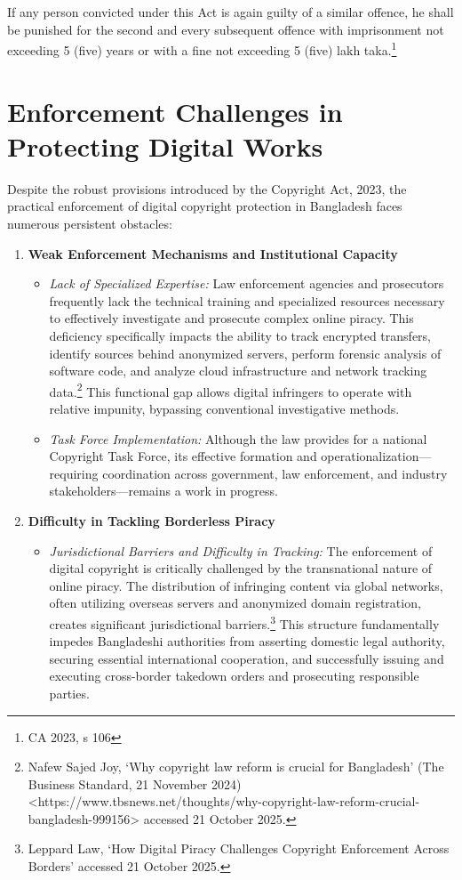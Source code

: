 \documentclass[10pt,letterpaper]{article}
\begin{document}
If any person convicted under this Act is again guilty of a similar offence, he shall be punished for the second and every subsequent offence with imprisonment not exceeding 5 (five) years or with a fine not exceeding 5 (five) lakh taka.\footnote{CA 2023, s 106}

\section{Enforcement Challenges in Protecting Digital Works}

Despite the robust provisions introduced by the Copyright Act, 2023, the practical enforcement of digital copyright protection in Bangladesh faces numerous persistent obstacles:

\begin{enumerate}
    \item \textbf{Weak Enforcement Mechanisms and Institutional Capacity}
    \begin{itemize}
        \item \textit{Lack of Specialized Expertise:} 
        Law enforcement agencies and prosecutors frequently lack the technical training and specialized resources necessary to effectively investigate and prosecute complex online piracy. This deficiency specifically impacts the ability to track encrypted transfers, identify sources behind anonymized servers, perform forensic analysis of software code, and analyze cloud infrastructure and network tracking data.\footnote{Nafew Sajed Joy, `Why copyright law reform is crucial for Bangladesh' (The Business Standard, 21 November 2024) <https://www.tbsnews.net/thoughts/why-copyright-law-reform-crucial-bangladesh-999156> accessed 21 October 2025.} This functional gap allows digital infringers to operate with relative impunity, bypassing conventional investigative methods.

        \item \textit{Task Force Implementation:} Although the law provides for a national Copyright Task Force, its effective formation and operationalization—requiring coordination across government, law enforcement, and industry stakeholders—remains a work in progress.
    \end{itemize}

    \item \textbf{Difficulty in Tackling Borderless Piracy}
    \begin{itemize}
        \item \textit{Jurisdictional Barriers and Difficulty in Tracking:} The enforcement of digital copyright is critically challenged by the transnational nature of online piracy. The distribution of infringing content via global networks, often utilizing overseas servers and anonymized domain registration, creates significant jurisdictional barriers.\footnote{Leppard Law, `How Digital Piracy Challenges Copyright Enforcement Across Borders' accessed 21 October 2025.} This structure fundamentally impedes Bangladeshi authorities from asserting domestic legal authority, securing essential international cooperation, and successfully issuing and executing cross-border takedown orders and prosecuting responsible parties.
   

\end{itemize}
\end{enumerate}
\end{document}
